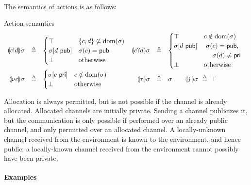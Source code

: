 \documentclass{entcs}
\begin{document}
The semantics of actions is as follows:
\begin{display}[$\ASem{\alpha}{} : \Sigma \ra \Sigma^\top_\bot$]{Action semantics}
\[
\begin{array}[t]{rcl@{\quad}rcl}
  \ASem{c!d}{\sigma} &\eqdef&
    \begin{cases}
      \top & \{c,d\}\not\subseteq \dom(\sigma) \\
      \sigma[d \ \pub] & \sigma(c) = \pub \\
      \bot & \ow
    \end{cases} &
  \ASem{c?d}{\sigma} &\eqdef&
    \begin{cases}
      \top & c \notin \dom(\sigma) \\
      \sigma[d \ \pub] & \! 
        \begin{array}[t]{l}
          \sigma(c) = \pub,\\ \quad \sigma(d) \neq \pri 
        \end{array} \\
      \bot & \ow
    \end{cases} \\
  \ASem{\nu c}{\sigma} &\eqdef&
    \begin{cases}
      \sigma[c \ \pri] & c \notin\dom(\sigma) \\
      \bot & \ow
    \end{cases} &
  \ASem{\tau}{\sigma} &\eqdef& \sigma \qquad
  \ASem{\fault}{\sigma} \ \eqdef\ \top
\end{array}  
\]
\end{display}
Allocation is always permitted, but is not possible if the channel is
already allocated.  Allocated channels are initially private.  Sending
a channel publicizes it, but the communication is only possible if
performed over an already public channel, and only permitted over an
allocated channel.  A locally-unknown channel received from the
environment is known to the environment, and hence public; a
locally-known channel received from the environment cannot possibly
have been private.

\paragraph{Examples}
\end{document}
